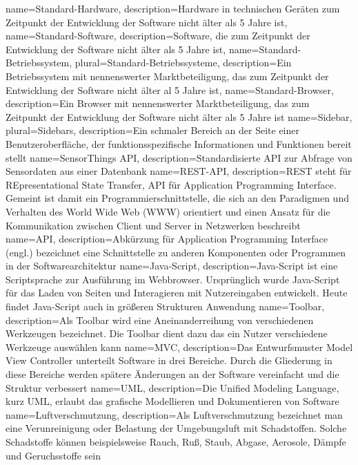 {
	name=Standard-Hardware,
	description={Hardware in technischen Geräten zum Zeitpunkt der Entwicklung der Software nicht älter als 5 Jahre ist},
}
{
	name=Standard-Software,
	description={Software, die zum Zeitpunkt der Entwicklung der Software nicht älter als 5 Jahre ist},
}
{
	name=Standard-Betriebssystem,
	plural=Standard-Betriebssysteme,
	description={Ein Betriebssystem mit nennenswerter Marktbeteiligung, das zum Zeitpunkt der Entwicklung der Software nicht älter al 5 Jahre ist},
}
{
	name=Standard-Browser,
	description={Ein Browser mit nennenswerter Marktbeteiligung, das zum Zeitpunkt der Entwicklung der Software nicht älter als 5 Jahre ist}
}
{
	name=Sidebar,
	plural=Sidebars,
	description={Ein schmaler Bereich an der Seite einer Benutzeroberfläche, der funktionsspezifische Informationen und Funktionen bereit stellt}
}
{
	name=SensorThings \gls{API},
	description={Standardisierte \gls{API} zur Abfrage von \gls{Sensor}daten aus einer Datenbank}
}
{
	name=REST-\gls{API},
	description={REST steht für REpresentational State Transfer, API für Application Programming Interface. Gemeint ist damit ein Programmierschnittstelle, die sich an den Paradigmen und Verhalten des World Wide Web (WWW) orientiert und einen Ansatz für die Kommunikation zwischen Client und Server in Netzwerken beschreibt}
}
{
	name=API,
	description={Abkürzung für Application Programming Interface (engl.) bezeichnet eine Schnittstelle zu anderen Komponenten oder Programmen in der Softwarearchitektur}
}
{
	name=Java-Script,
	description={Java-Script ist eine Scriptsprache zur Ausführung im Webbrowser. Ursprünglich wurde Java-Script für das Laden von Seiten und Interagieren mit Nutzereingaben entwickelt. Heute findet Java-Script auch in größeren Strukturen Anwendung}
}
{
	name=Toolbar,
	description={Als Toolbar wird eine Aneinanderreihung von verschiedenen Werkzeugen bezeichnet. Die Toolbar dient dazu das ein Nutzer verschiedene Werkzeuge auswählen kann}
}
{
	name=MVC,
	description={Das Entwurfsmuster Model View Controller unterteilt Software in drei Bereiche. Durch die Gliederung in diese Bereiche werden spätere Änderungen an der Software vereinfacht und die Struktur verbessert}
}
{
	name=UML,
	description={Die Unified Modeling Language, kurz UML, erlaubt das grafische Modellieren und Dokumentieren von Software}
}
{
	name=Luftverschmutzung,
	description={Als Luftverschmutzung bezeichnet man eine Verunreinigung oder Belastung der Umgebungsluft mit Schadstoffen. Solche Schadstoffe können beispielsweise  Rauch, Ruß, Staub, Abgase, Aerosole, Dämpfe und Geruchsstoffe sein}
}